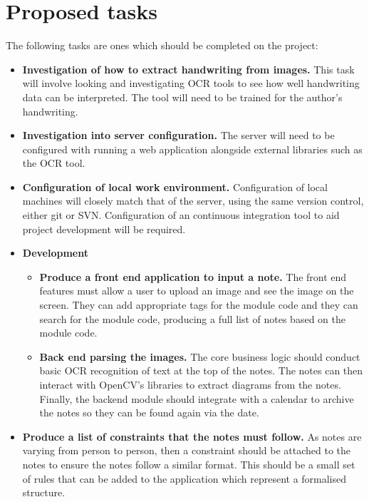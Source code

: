 \documentclass[11pt,fleqn,twoside]{article}
\begin{document}
\section{Proposed tasks}
The following tasks are ones which should be completed on the project:
\begin{itemize}

\item \textbf{Investigation of how to extract handwriting from images.} This task will involve looking and investigating OCR tools to see how well handwriting data can be interpreted. The tool will need to be trained for the author's handwriting.

\item \textbf{Investigation into server configuration.} The server will need to be configured with running a web application alongside external libraries such as the OCR tool.

\item \textbf{Configuration of local work environment.} Configuration of local machines will closely match that of the server, using the same version control, either git or SVN. Configuration  of an continuous integration tool to aid project development will be required.

\item \textbf{Development}
  \begin{itemize}

    \item \textbf{Produce a front end application to input a note.} The front end features must allow a user to upload an image and see the image on the screen. They can add appropriate tags for the module code and they can search for the module code, producing a full list of notes based on the module code.

    \item \textbf{Back end parsing the images.} The core business logic should conduct basic OCR recognition of text at the top of the notes. The notes can then interact with OpenCV's libraries to extract diagrams from the notes. Finally, the backend module should integrate with a calendar to archive the notes so they can be found again via the date.

  \end{itemize}

\item \textbf{Produce a list of constraints that the notes must follow.} As notes are varying from person to person, then a constraint should be attached to the notes to ensure the notes follow a similar format. This should be a small set of rules that can be added to the application which represent a formalised structure.


\end{itemize}
\end{document}
